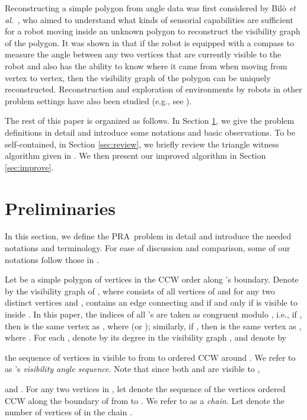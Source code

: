 \documentclass[11pt]{article}
\def\pra{PRA}
\def\sectionspace{\vspace*{0in}}
\begin{document}
Reconstructing a simple polygon from angle data was first
considered by Bil\`o {\em et al}.~\cite{ref:BiloRe09}, who aimed to understand what kinds of
sensorial capabilities are sufficient for a robot moving inside an unknown
polygon to reconstruct the visibility graph of the polygon. 
It was shown in \cite{ref:BiloRe09} that if the robot is equipped with a compass
to measure the angle between any two vertices that are
currently visible to the robot
and also has the ability to know where it came from when
moving from vertex to vertex, 
then the visibility graph of the polygon
can be uniquely reconstructed. Reconstruction and exploration of environments 
by robots in other problem settings have also been studied (e.g.,
see \cite{ref:DudekRo91,ref:FlocchiniTh99,ref:SuriSi08}). 

The rest of this paper is organized as follows. In Section \ref{sec:pre}, we 
give the problem definitions in detail and
introduce some notations and basic observations. 
To be self-contained, in Section \ref{sec:review}, we briefly review the
triangle witness algorithm given in \cite{ref:DisserRe10}. 
We then present our improved algorithm in Section \ref{sec:improve}. 

\sectionspace
\section{Preliminaries}
\label{sec:pre}
In this section, we define the \pra\ problem in detail and introduce
the needed notations and terminology. For ease of discussion and comparison, some of our
notations follow those in \cite{ref:DisserRe10}. 

Let  be a simple polygon of  vertices  in the CCW
order along 's boundary. Denote by  the visibility graph
of , where  consists of all vertices of  and for any two distinct
vertices  and ,  contains an edge  connecting  and
 if and only if  is visible to  inside . In this
paper, the indices of all 's are taken as congruent modulo ,
i.e., if , then  is the same vertex as , where
 (or ); similarly, if , then  is the same
vertex as , where . For each ,
denote by  its degree in the visibility graph , and denote by
 
the sequence of vertices in  visible to  from  to
 ordered CCW around . We refer to  as 's
{\em visibility angle sequence}. 
Note that since both  and  are visible to , 

and . For any two vertices  in
, let  denote the sequence
 of the vertices ordered CCW along the
boundary of  from  to . We refer to
 as a {\em chain}. Let  denote the
number of vertices of  in the chain . 
\end{document}
